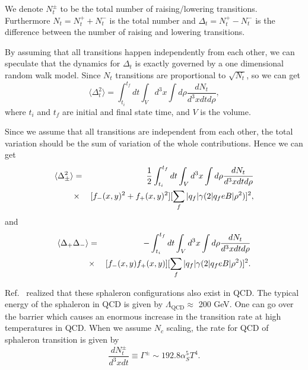 \documentclass[twocolumn,showpacs,preprintnumbers,amsmath,amssymb]{revtex4}
\begin{document}
We denote $N_{t}^{\pm}$ to be the total number of raising/lowering transitions. Furthermore $N_{t} = N^{+}_{t}+N^{-}_{t}$ is the total number and $\Delta_{t}=N^{+}_{t}-N^{-}_{t}$ is the
difference between the number of raising and lowering transitions.

By assuming that all transitions happen independently from each other, we can speculate that the dynamics for $\Delta_{t}$ is exactly governed by a one dimensional random walk
model. Since $N_{t}$ transitions are proportional to $\sqrt{N_{t}}$, so we can get
\begin{equation}%
\langle \Delta_{t}^{2} \rangle=\int_{t_{i}}^{t_{f}}dt\int_{V}d^{3}x\int d\rho\frac{dN_{t}}{d^{3}xdtd\rho},
\label{eq:eq6} %
\end{equation}
where $t_{i}$ and $t_{f}$ are initial and final state time, and $V$ is the volume.

Since we assume that all transitions are independent
from each other, the total variation should be the sum of variation of the whole contributions. Hence we can get
\begin{eqnarray}
\langle \Delta_{\pm}^{2} \rangle&=&\frac{1}{2}\int_{t_{i}}^{t_{f}}dt\int_{V}d^{3}x\int d\rho\frac{dN_{t}}{d^{3}xdtd\rho}\\
&\times&[f_{-}(x,y)^{2}+f_{+}(x,y)^{2}]\large[\sum_{f}|q_{f}|\gamma(2|q_{f}eB|\rho^{2})\large]^{2}\nonumber,
\label{eq:eq7} %
\end{eqnarray}
and
\begin{eqnarray}
\langle \Delta_{+}\Delta_{-} \rangle&=&-\int_{t_{i}}^{t_{f}}dt\int_{V}d^{3}x\int d\rho\frac{dN_{t}}{d^{3}xdtd\rho}\\
&\times&[f_{-}(x,y)f_{+}(x,y)]\large[\sum_{f}|q_{f}|\gamma(2|q_{f}eB|\rho^{2})\large]^{2}\nonumber.
\label{eq:eq8} %
\end{eqnarray}

Ref.~\cite{lab23} realized that these sphaleron configurations also exist in QCD. The typical energy of the
sphaleron in QCD is given by $\Lambda_{\textrm{QCD}}\approx$ 200 GeV. One can go over the barrier which causes an
enormous increase in the transition rate at high temperatures in QCD. When we assume $N_{c}$ scaling, the rate for QCD
of sphaleron transition is given by~\cite{lab23,lab24,lab25}
\begin{equation}%
\frac{dN_{t}^{\pm}}{d^{3}xdt}\equiv\Gamma^{\pm}\sim192.8\alpha_{S}^{5}T^{4}.
\label{eq:eq9} %
\end{equation}
\end{document}
